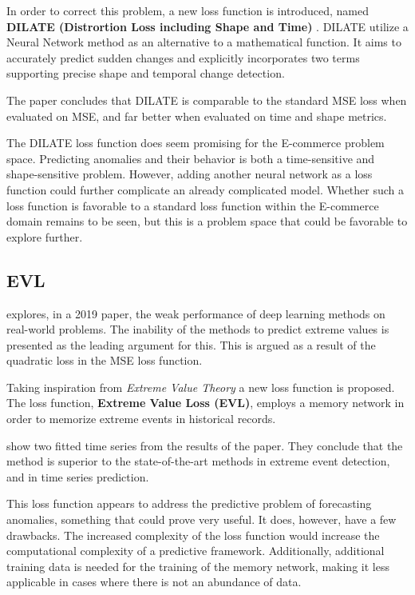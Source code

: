 In order to correct this problem, a new loss function is introduced, named
\textbf{DILATE (Distrortion Loss including Shape and Time)} \cite{Guen2019}.
DILATE utilize a Neural Network method as an alternative to a mathematical function.
It aims to accurately predict sudden changes and explicitly incorporates two terms
supporting precise shape and temporal change detection.

The paper concludes that DILATE is comparable to the standard MSE loss when evaluated on MSE,
and far better when evaluated on time and shape metrics.

The DILATE loss function does seem promising for the E-commerce problem space.
Predicting anomalies and their behavior is both a time-sensitive and shape-sensitive problem.
However, adding another neural network as a loss function could further complicate an already complicated model.
Whether such a loss function is favorable to a standard loss function within the E-commerce domain remains to be seen,
but this is a problem space that could be favorable to explore further.

\subsection{EVL}
\citeauthor{Ding2019} explores, in a 2019 paper, the weak performance of deep learning methods on real-world problems.
The inability of the methods to predict extreme values is presented as the leading argument for this.
This is argued as a result of the quadratic loss in the MSE loss function.

Taking inspiration from \textit{Extreme Value Theory} a new loss function is proposed.
The loss function, \textbf{Extreme Value Loss (EVL)},
employs a memory network in order to memorize extreme events in historical records.

 show two fitted time series from the results of the paper. They conclude
that the method is superior to the state-of-the-art methods in extreme event detection, and
in time series prediction.

This loss function appears to address the predictive problem of forecasting anomalies,
something that could prove very useful.
It does, however, have a few drawbacks.
The increased complexity of the loss function would increase the computational complexity of a predictive framework.
Additionally, additional training data is needed for the training of the memory network,
making it less applicable in cases where there is not an abundance of data.

